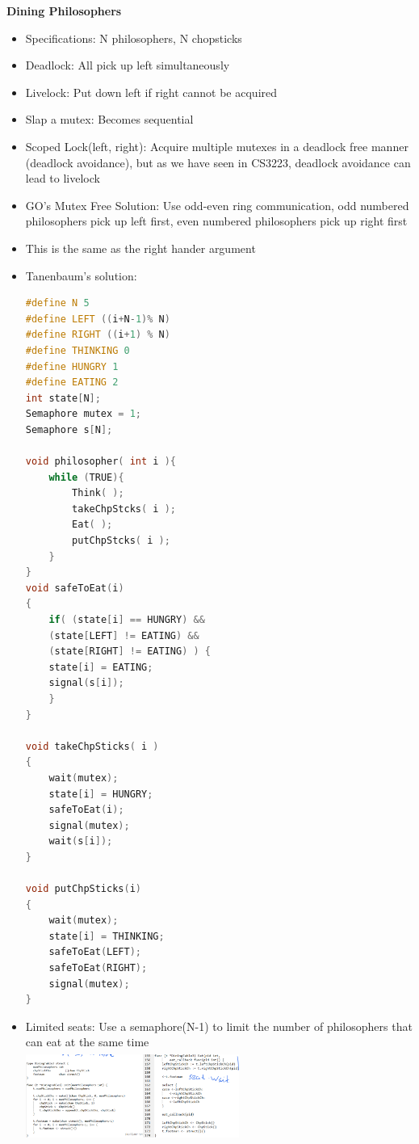 \documentclass[10pt, landscape]{article}
\begin{document}
\begin{multicols}{4}
\textbf{Dining Philosophers} \\
\begin{itemize}
    \item Specifications: N philosophers, N chopsticks
    \item Deadlock: All pick up left simultaneously
    \item Livelock: Put down left if right cannot be acquired
    \item Slap a mutex: Becomes sequential 
    \item Scoped Lock(left, right): Acquire multiple mutexes in a deadlock free manner (deadlock avoidance), but as we have seen in CS3223, deadlock avoidance can lead to livelock
    \item GO's Mutex Free Solution: Use odd-even ring communication, odd numbered philosophers pick up left first, even numbered philosophers pick up right first
    \item This is the same as the right hander argument 
    \item Tanenbaum's solution: 
    \begin{lstlisting}[language=C++, breaklines=true, breakatwhitespace=true]
#define N 5
#define LEFT ((i+N-1)% N)
#define RIGHT ((i+1) % N)
#define THINKING 0
#define HUNGRY 1
#define EATING 2
int state[N];
Semaphore mutex = 1;
Semaphore s[N];

void philosopher( int i ){
    while (TRUE){
        Think( );
        takeChpStcks( i );
        Eat( );
        putChpStcks( i );
    }
}
void safeToEat(i)
{
    if( (state[i] == HUNGRY) && 
    (state[LEFT] != EATING) && 
    (state[RIGHT] != EATING) ) {
    state[i] = EATING;
    signal(s[i]); 
    }
}

void takeChpSticks( i )
{
    wait(mutex);
    state[i] = HUNGRY;
    safeToEat(i);
    signal(mutex);
    wait(s[i]);
}

void putChpSticks(i)
{
    wait(mutex);
    state[i] = THINKING;
    safeToEat(LEFT);
    safeToEat(RIGHT);
    signal(mutex);
}
    \end{lstlisting}
    \item Limited seats: Use a semaphore(N-1) to limit the number of philosophers that can eat at the same time \\ 
    \includegraphics*[width=7cm, height=3cm]{godiningphilo.png}
\end{itemize}


\end{multicols}
\end{document}
